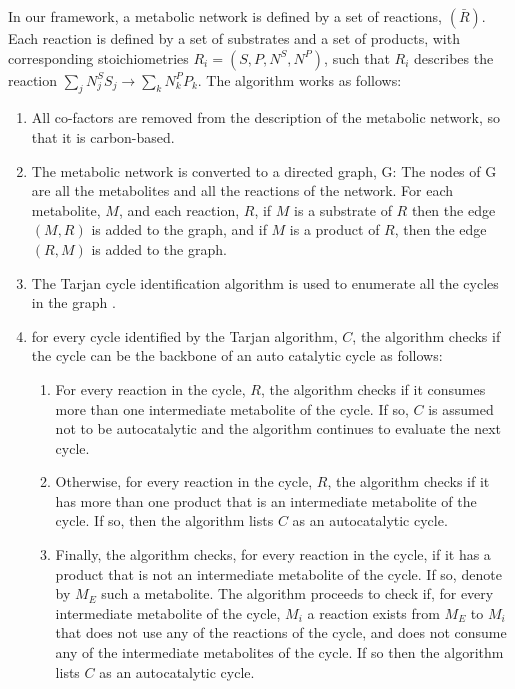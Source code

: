   In our framework, a metabolic network is defined by a set of reactions, $(\bar{R})$.
  Each reaction is defined by a set of substrates and a set of products, with corresponding stoichiometries $R_i=(S,P,N^S,N^P)$, such that $R_i$ describes the reaction $\sum_j N_j^SS_j \rightarrow \sum_k N_k^PP_k$.
  The algorithm works as follows:
  \begin{enumerate}
    \item All co-factors are removed from the description of the metabolic network, so that it is carbon-based.
    \item The metabolic network is converted to a directed graph, G:
  The nodes of G are all the metabolites and all the reactions of the network.
  For each metabolite, $M$, and each reaction, $R$, if $M$ is a substrate of $R$ then the edge $(M,R)$ is added to the graph, and if $M$ is a product of $R$, then the edge $(R,M)$ is added to the graph.
    \item The Tarjan cycle identification algorithm is used to enumerate all the cycles in the graph \cite{Tarjan1973-gn}.
    \item for every cycle identified by the Tarjan algorithm, $C$, the algorithm checks if the cycle can be the backbone of an auto catalytic cycle as follows:
        \begin{enumerate}
            \item For every reaction in the cycle, $R$, the algorithm checks if it consumes more than one  intermediate metabolite of the cycle.
              If so, $C$ is assumed not to be autocatalytic and the algorithm continues to evaluate the next cycle.
            \item Otherwise, for every reaction in the cycle, $R$, the algorithm checks if it has more than one product that is an intermediate metabolite of the cycle.
              If so, then the algorithm lists $C$ as an autocatalytic cycle.
            \item Finally, the algorithm checks, for every reaction in the cycle, if it has a product that is not an intermediate metabolite of the cycle.
                If so, denote by $M_E$ such a metabolite.
            The algorithm proceeds to check if, for every intermediate metabolite of the cycle, $M_i$ a reaction exists from $M_E$ to $M_i$ that does not use any of the reactions of the cycle, and does not consume any of the intermediate metabolites of the cycle.
            If so then the algorithm lists $C$ as an autocatalytic cycle.
        \end{enumerate}
  \end{enumerate}

